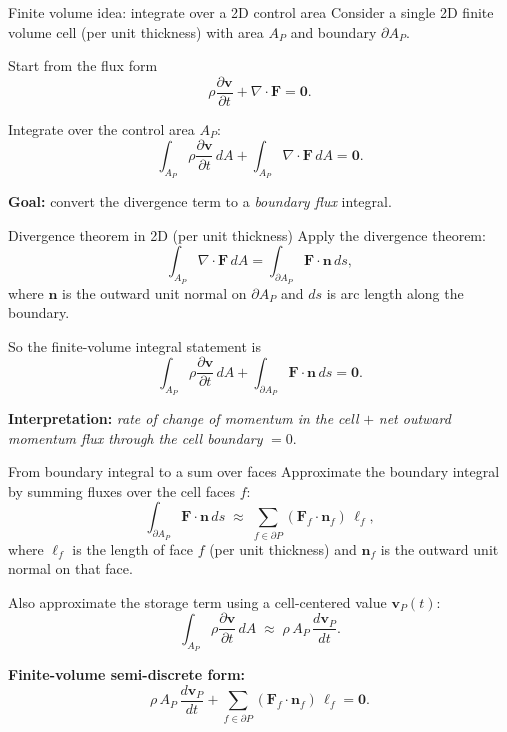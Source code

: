 \documentclass[aspectratio=169]{beamer}
\begin{document}
\begin{frame}{Finite volume idea: integrate over a 2D control area}
Consider a single 2D finite volume cell (per unit thickness) with area $A_P$
and boundary $\partial A_P$.

\bigskip
Start from the flux form
\[
\rho \frac{\partial \mathbf{v}}{\partial t}+\nabla\cdot\mathbf{F}=\mathbf{0}.
\]

\bigskip
Integrate over the control area $A_P$:
\[
\int_{A_P}\rho \frac{\partial \mathbf{v}}{\partial t}\,dA
+
\int_{A_P}\nabla\cdot\mathbf{F}\,dA
=
\mathbf{0}.
\]

\bigskip
\textbf{Goal:} convert the divergence term to a \emph{boundary flux} integral.
\end{frame}
\begin{frame}{Divergence theorem in 2D (per unit thickness)}
Apply the divergence theorem:
\[
\int_{A_P}\nabla\cdot\mathbf{F}\,dA
=
\int_{\partial A_P}\mathbf{F}\cdot\mathbf{n}\,ds,
\]
where $\mathbf{n}$ is the outward unit normal on $\partial A_P$ and $ds$ is
arc length along the boundary.

\bigskip
So the finite-volume integral statement is
\[
\boxed{
\int_{A_P}\rho \frac{\partial \mathbf{v}}{\partial t}\,dA
+
\int_{\partial A_P}\mathbf{F}\cdot\mathbf{n}\,ds
=
\mathbf{0}.
}
\]

\bigskip
\textbf{Interpretation:} \emph{rate of change of momentum in the cell}
$+$ \emph{net outward momentum flux through the cell boundary} $=0$.
\end{frame}

\begin{frame}{From boundary integral to a sum over faces}
Approximate the boundary integral by summing fluxes over the cell faces $f$:
\[
\int_{\partial A_P}\mathbf{F}\cdot\mathbf{n}\,ds
\;\approx\;
\sum_{f\in\partial P}\left(\mathbf{F}_f\cdot\mathbf{n}_f\right)\,\ell_f,
\]
where $\ell_f$ is the length of face $f$ (per unit thickness) and
$\mathbf{n}_f$ is the outward unit normal on that face.

\bigskip
Also approximate the storage term using a cell-centered value $\mathbf{v}_P(t)$:
\[
\int_{A_P}\rho \frac{\partial \mathbf{v}}{\partial t}\,dA
\;\approx\;
\rho\,A_P\,\frac{d\mathbf{v}_P}{dt}.
\]

\bigskip
\textbf{Finite-volume semi-discrete form:}
\[
\boxed{
\rho\,A_P\,\frac{d\mathbf{v}_P}{dt}
+
\sum_{f\in\partial P}\left(\mathbf{F}_f\cdot\mathbf{n}_f\right)\,\ell_f
=
\mathbf{0}.
}
\]
\end{frame}
\end{document}
